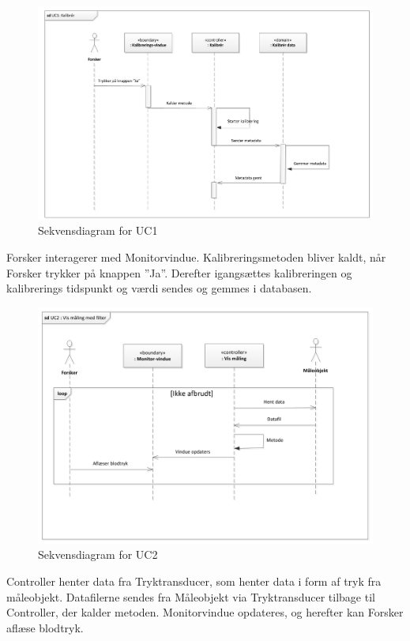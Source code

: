 \begin{figure}[H]
	\centering
	\includegraphics[width=1\textwidth]{Figurer/Snip20151104_31}
	\caption{Sekvensdiagram for UC1}
\end{figure}

Forsker interagerer med Monitorvindue. Kalibreringsmetoden bliver kaldt, når Forsker trykker på knappen ”Ja”. Derefter igangsættes kalibreringen og kalibrerings tidspunkt og værdi sendes og gemmes i databasen. 

\begin{figure}[H]
	\centering
	\includegraphics[width=1\textwidth]{Figurer/Snip20151104_32}
	\caption{Sekvensdiagram for UC2}
\end{figure}

Controller henter data fra Tryktransducer, som henter data i form af tryk fra måleobjekt. Datafilerne sendes fra Måleobjekt via Tryktransducer tilbage til Controller, der kalder metoden. Monitorvindue opdateres, og herefter kan Forsker aflæse blodtryk. 

